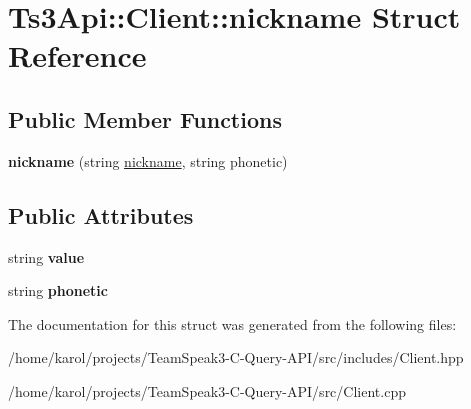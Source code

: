 \hypertarget{struct_ts3_api_1_1_client_1_1nickname}{}\section{Ts3\+Api\+:\+:Client\+:\+:nickname Struct Reference}
\label{struct_ts3_api_1_1_client_1_1nickname}
\subsection*{Public Member Functions}
\begin{DoxyCompactItemize}
\item 
{\bfseries nickname} (string \hyperlink{struct_ts3_api_1_1_client_1_1nickname}{nickname}, string phonetic)\hypertarget{struct_ts3_api_1_1_client_1_1nickname_a1b89520081796e96c17bb041900265bc}{}\label{struct_ts3_api_1_1_client_1_1nickname_a1b89520081796e96c17bb041900265bc}

\end{DoxyCompactItemize}
\subsection*{Public Attributes}
\begin{DoxyCompactItemize}
\item 
string {\bfseries value}\hypertarget{struct_ts3_api_1_1_client_1_1nickname_a0c0b1bd5e3cfc5eb90d0ba98428ef398}{}\label{struct_ts3_api_1_1_client_1_1nickname_a0c0b1bd5e3cfc5eb90d0ba98428ef398}

\item 
string {\bfseries phonetic}\hypertarget{struct_ts3_api_1_1_client_1_1nickname_aa6e3a9190205ddf1cca72c279376b7c4}{}\label{struct_ts3_api_1_1_client_1_1nickname_aa6e3a9190205ddf1cca72c279376b7c4}

\end{DoxyCompactItemize}


The documentation for this struct was generated from the following files\+:\begin{DoxyCompactItemize}
\item 
/home/karol/projects/\+Team\+Speak3-\/\+C-\/\+Query-\/\+A\+P\+I/src/includes/Client.\+hpp\item 
/home/karol/projects/\+Team\+Speak3-\/\+C-\/\+Query-\/\+A\+P\+I/src/Client.\+cpp\end{DoxyCompactItemize}

